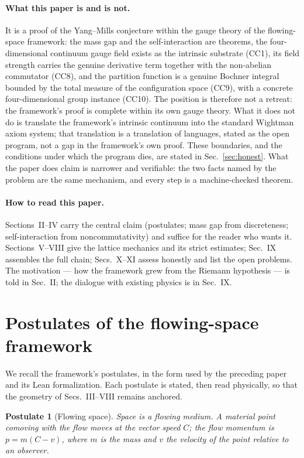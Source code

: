 \documentclass[aps,prd,preprint,superscriptaddress,amsmath,amssymb]{revtex4-2}
\newtheorem{postulate}{Postulate}[section]
\begin{document}
\paragraph{What this paper is and is not.}
It is a proof of the Yang--Mills conjecture within the gauge theory
of the flowing-space framework: the mass gap and the
self-interaction are theorems, the four-dimensional continuum gauge
field exists as the intrinsic substrate (CC1), its field strength
carries the genuine derivative term together with the non-abelian
commutator (CC8), and the partition function is a genuine Bochner
integral bounded by the total measure of the configuration space
(CC9), with a concrete four-dimensional group instance (CC10).  The
position is therefore not a retreat: the framework's proof is
complete within its own gauge theory.  What it does not do is
translate the framework's intrinsic continuum into the standard
Wightman axiom system; that translation is a translation of
languages, stated as the open program, not a gap in the framework's
own proof.  These boundaries, and the conditions under which the
program dies, are stated in Sec.~\ref{sec:honest}.  What the paper does claim is
narrower and verifiable: the two facts named by the problem are the
same mechanism, and every step is a machine-checked theorem.

\paragraph{How to read this paper.}
Sections~II--IV carry the central claim (postulates; mass gap from
discreteness; self-interaction from noncommutativity) and suffice for
the reader who wants it.  Sections~V--VIII give the lattice mechanics
and its strict estimates; Sec.~IX assembles the full chain;
Secs.~X--XI assess honestly and list the open problems.  The
motivation --- how the framework grew from the Riemann hypothesis ---
is told in Sec.~II; the dialogue with existing physics is in
Sec.~IX.

\section{Postulates of the flowing-space framework}
\label{sec:postulates}

We recall the framework's postulates, in the form used by the
preceding paper and its Lean formalization.  Each postulate is
stated, then read physically, so that the geometry of
Secs.~III--VIII remains anchored.

\begin{postulate}[Flowing space]
\label{post:flow}
Space is a flowing medium.  A material point comoving with the flow
moves at the vector speed $C$; the flow momentum is
$p=m(C-v)$, where $m$ is the mass and $v$ the velocity of the
point relative to an observer.
\end{postulate}
\end{document}

